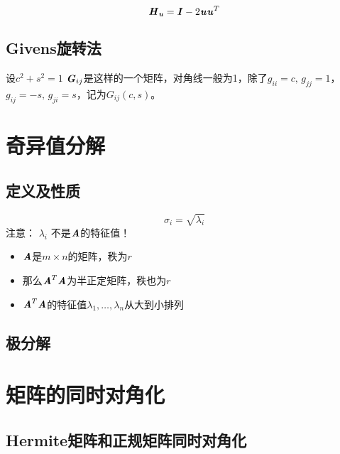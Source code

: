 \begin{definition}
    $$
    \boldsymbol{\mathit{H}}_{\boldsymbol{\mathit{u}}} = \boldsymbol{\mathit{I}} - 2\boldsymbol{\mathit{u}} \boldsymbol{\mathit{u}}^T
    $$
\end{definition}

\subsection{Givens旋转法}
\label{sub:Givens旋转法}

\begin{definition}
    设$c^2 + s^2 = 1$
    $\boldsymbol{\mathit{G}}_{ij}$是这样的一个矩阵，对角线一般为1，除了$g_{ii}=c,\,g_{jj}=1$，$g_{ij}=-s,\,g_{ji}=s$，记为$G_{ij}(c,s)$。
\end{definition}

\section{奇异值分解}
\label{sec:奇异值分解}

\subsection{定义及性质}
\label{sub:定义及性质}

\begin{definition}[奇异值]
    $$
    \sigma_i = \sqrt{\lambda_i}
    $$
    注意： $\lambda_i$ 不是$\boldsymbol{\mathit{A}}$的特征值！
    \begin{itemize}
        \item $\boldsymbol{\mathit{A}}$是$m \times n$的矩阵，秩为$r$
        \item 那么$\boldsymbol{\mathit{A}}^T\boldsymbol{\mathit{A}}$为半正定矩阵，秩也为$r$
        \item $\boldsymbol{\mathit{A}}^T\boldsymbol{\mathit{A}}$的特征值$\lambda_1, \ldots, \lambda_n$从大到小排列
    \end{itemize}
\end{definition}

\subsection{极分解}
\label{sub:极分解}

\section{矩阵的同时对角化}
\label{sec:矩阵的同时对角化}

\subsection{Hermite矩阵和正规矩阵同时对角化}
\label{sub:Hermite矩阵和正规矩阵同时对角化}

